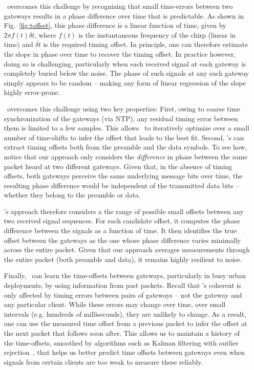  \name\ overcomes this challenge by recognizing that small time-errors between two gateways results in a phase difference over time that is predictable. As shown in Fig.~\ref{fig:toffset}, this phase difference is a linear function of time, given by $2\pi f(t) \delta t$, where $f(t)$ is the instantaneous frequency of the chirp (linear in time) and $\delta t$ is the required timing offset. In principle, one can therefore estimate the slope in phase over time to recover the timing offset. In practice however, doing so is challenging, particularly when each received signal at each gateway is completely buried below the noise. The phase of such signals at any such gateway simply appears to be random -- making any form of linear regression of the slope highly error-prone.

\name\ overcomes this challenge using two key properties: First, owing to coarse time synchronization of the gateways (via NTP), any residual timing error between them is limited to a few samples. This allows \name\ to iteratively optimize over a small number of time-shifts to infer the offset that leads to the best fit. Second, \name's can extract timing offsets both from the preamble and the data symbols. To see how, notice that our approach only considers the {\it difference} in phase between the same packet heard at two different gateways. Given that, in the absence of timing offsets, both gateways perceive the same underlying message bits over time, the resulting phase difference would be independent of the transmitted data bits -- whether they belong to the preamble or data. 

\name's approach therefore considers a the range of possible small offsets between any two received signal sequences. For each candidate offset, it computes the phase difference between the signals as a function of time. It then identifies the true offset between the gateways as the one whose phase difference varies minimally across the entire packet. Given that our approach averages measurements through the entire packet (both preamble and data), it remains highly resilient to noise.\vspace*{0.1in}


 Finally, \name\ can learn the time-offsets between gateways, particularly in busy urban deployments, by using information from past packets. Recall that \name's coherent is only affected by timing errors between pairs of gateways -- not the gateway and any particular client. While these errors may change over time, over small intervals (e.g. hundreds of milliseconds), they are unlikely to change. As a result, one can use the measured time offset from a previous packet to infer the offset at the next packet that follows soon after. This allows us to maintain a history of the time-offsets, smoothed by algorithms such as Kalman filtering with outlier rejection~\cite{}, that helps us better predict time offsets between gateways even when signals from certain clients are too weak to measure these reliably. 



